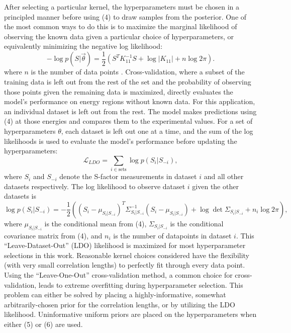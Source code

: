 \documentclass[%
 reprint,
superscriptaddress,
nofootinbib,
 amsmath,amssymb,
 aps,
 pra,
]{revtex4-2}
\begin{document}
After selecting a particular kernel, the hyperparameters must be chosen in a principled manner before using (4) to draw samples from the posterior. One of the most common ways to do this is to maximize the marginal likelihood of observing the known data given a particular choice of hyperparameters, or equivalently minimizing the negative log likelihood: 
\begin{equation}
	-\log{p\left( S | \vec{\theta} \right)} = \frac{1}{2} \left( S^T K_{11}^{-1} S + \log{|K_{11}|} + n \log{2\pi} \right).
\end{equation}
where $n$ is the number of data points \cite{Rasmussen2006}. Cross-validation, where a subset of the training data is left out from the rest of the set and the probability of observing those points given the remaining data is maximized, directly evaluates the model's performance on energy regions without known data. For this application, an individual dataset is left out from the rest. The model makes predictions using (4) at those energies and compares them to the experimental values. For a set of hyperparameters $\theta$, each dataset is left out one at a time, and the sum of the log likelihoods is used to evaluate the model's performance before updating the hyperparameters:
\begin{equation}
	\mathcal{L}_{LDO} = \sum_{i\in\text{sets}} \log p(S_i | S_{-i}),
\end{equation}
where $S_i$ and $S_{-i}$ denote the S-factor measurements in dataset $i$ and all other datasets respectively. The log likelihood to observe dataset $i$ given the other datasets is 
\begin{equation}
	\log p(S_i | S_{-i}) = -\frac{1}{2} \left( (S_i - \mu_{S_i | S_{-i}})^T \Sigma_{S_i | S_{-i}}^{-1} (S_i - \mu_{S_i | S_{-i}}) + \log \det  \Sigma_{S_i | S_{-i}} + n_i \log 2\pi \right), \nonumber
\end{equation}
where $\mu_{S_i | S_{-i}}$ is the conditional mean from (4),  $\Sigma_{S_i | S_{-i}}$ is the conditional covariance matrix from (4), and $n_i$ is the number of datapoints in dataset $i$. This ``Leave-Dataset-Out'' (LDO) likelihood is maximized for most hyperparameter selections in this work. Reasonable kernel choices considered have the flexibility (with very small correlation lengths) to perfectly fit through every data point. Using the ``Leave-One-Out'' cross-validation method, a common choice for cross-validation, leads to extreme overfitting during hyperparameter selection. This problem can either be solved by placing a highly-informative, somewhat arbitrarily-chosen prior for the correlation lengths, or by utilizing the LDO likelihood. Uninformative uniform priors are placed on the hyperparameters when either (5) or (6) are used.
\end{document}
